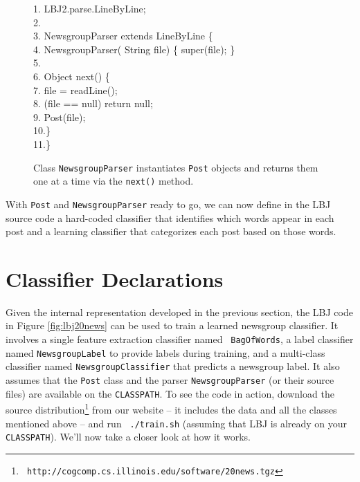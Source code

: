 \begin{figure}[t]
\begin{code}
1.  LBJ2.parse.LineByLine; \\
2. \>\\
3.  NewsgroupParser
         {\color{ForestGreen} extends} LineByLine \{ \\
4. \>
         NewsgroupParser({\color{BrickRed} String} file)
         \{ {\color{ForestGreen} super}(file); \} \\
5. \>\\
6. \> {\color{BrickRed} Object} next() \{ \\
7. \>\> file = readLine(); \\
8. \>\> (file == {\color{BrickRed} null})
           {\color{YellowOrange} return} {\color{BrickRed} null};
            \\
9. \>\> Post(file); \\
10.\>\>\} \\
11.\>\}
\end{code}
\caption{Class {\tt NewsgroupParser} instantiates {\tt Post} objects and
returns them one at a time via the {\tt next()} method.}
\label{fig:newsParser}
\end{figure}

With {\tt Post} and {\tt NewsgroupParser} ready to go, we can now define in
the LBJ source code a hard-coded classifier that identifies which words appear
in each post and a learning classifier that categorizes each post based on
those words.

\section{Classifier Declarations}

Given the internal representation developed in the previous section, the LBJ
code in Figure \ref{fig:lbj20news} can be used to train a learned newsgroup
classifier.  It involves a single feature extraction classifier named {\tt
BagOfWords}, a label classifier named {\tt NewsgroupLabel} to provide labels
during training, and a multi-class classifier named {\tt NewsgroupClassifier}
that predicts a newsgroup label.  It also assumes that the {\tt Post} class
and the parser {\tt NewsgroupParser} (or their source files) are available on
the {\tt CLASSPATH}.  To see the code in action, download the source
distribution\footnote{{\tt
http://cogcomp.cs.illinois.edu/software/20news.tgz}} from our website -- it
includes the data and all the classes mentioned above -- and run {\tt
./train.sh} (assuming that LBJ is already on your {\tt CLASSPATH}).  We'll now
take a closer look at how it works.

